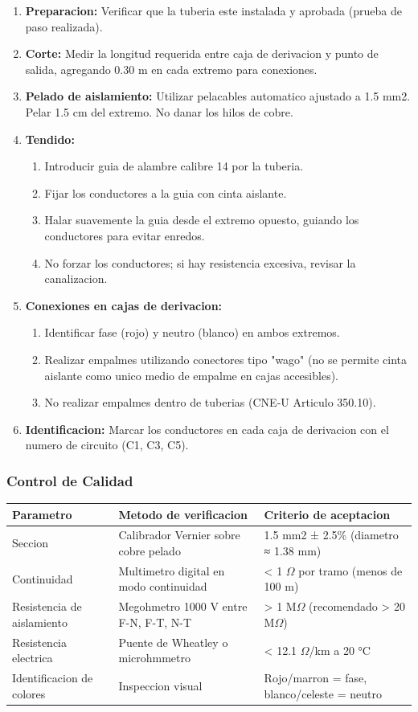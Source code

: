 \begin{enumerate}
  \item \textbf{Preparacion:} Verificar que la tuberia este instalada y aprobada (prueba de paso realizada).
  \item \textbf{Corte:} Medir la longitud requerida entre caja de derivacion y punto de salida, agregando 0.30 m en cada extremo para conexiones.
  \item \textbf{Pelado de aislamiento:} Utilizar pelacables automatico ajustado a 1.5 mm2. Pelar 1.5 cm del extremo. No danar los hilos de cobre.
  \item \textbf{Tendido:}
  \begin{enumerate}
    \item Introducir guia de alambre calibre 14 por la tuberia.
    \item Fijar los conductores a la guia con cinta aislante.
    \item Halar suavemente la guia desde el extremo opuesto, guiando los conductores para evitar enredos.
    \item No forzar los conductores; si hay resistencia excesiva, revisar la canalizacion.
  \end{enumerate}
  \item \textbf{Conexiones en cajas de derivacion:}
  \begin{enumerate}
    \item Identificar fase (rojo) y neutro (blanco) en ambos extremos.
    \item Realizar empalmes utilizando conectores tipo "wago" (no se permite cinta aislante como unico medio de empalme en cajas accesibles).
    \item No realizar empalmes dentro de tuberias (CNE-U Articulo 350.10).
  \end{enumerate}
  \item \textbf{Identificacion:} Marcar los conductores en cada caja de derivacion con el numero de circuito (C1, C3, C5).
\end{enumerate}

\subsubsection{Control de Calidad}

\begin{longtable}{L{4.5cm} L{4.5cm} L{4.5cm}}
\toprule
\textbf{Parametro} & \textbf{Metodo de verificacion} & \textbf{Criterio de aceptacion} \\
\midrule
Seccion & Calibrador Vernier sobre cobre pelado & 1.5 mm2 ± 2.5\% (diametro ≈ 1.38 mm) \\
Continuidad & Multimetro digital en modo continuidad & < 1 $\Omega$ por tramo (menos de 100 m) \\
Resistencia de aislamiento & Megohmetro 1000 V entre F-N, F-T, N-T & > 1 M$\Omega$ (recomendado > 20 M$\Omega$) \\
Resistencia electrica & Puente de Wheatley o microhmmetro & < 12.1 $\Omega$/km a 20 °C \\
Identificacion de colores & Inspeccion visual & Rojo/marron = fase, blanco/celeste = neutro \\
\bottomrule
\end{longtable}

